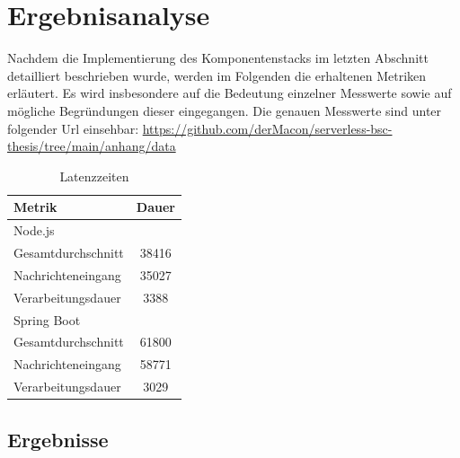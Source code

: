 \chapter{Ergebnisanalyse}
\label{ch:ergebnisanalyse}

Nachdem die Implementierung des Komponentenstacks im letzten Abschnitt detailliert beschrieben wurde, werden im Folgenden die erhaltenen Metriken erläutert. Es wird insbesondere auf die Bedeutung einzelner Messwerte sowie auf mögliche Begründungen dieser eingegangen. Die genauen Messwerte sind unter folgender Url einsehbar: \url{https://github.com/derMacon/serverless-bsc-thesis/tree/main/anhang/data}

\label{tab:latency}
\begin{table}[ht!]
  \centering
  \begin{tabular}{@{}lc@{}}
    \toprule
    Metrik & Dauer \\
    \midrule
    Node.js \\
    \hspace{3mm}Gesamtdurchschnitt & 38416 \\
    \hspace{3mm}Nachrichteneingang & 35027 \\
    \hspace{3mm}Verarbeitungsdauer & 3388 \\
    \midrule
    Spring Boot \\
    \hspace{3mm}Gesamtdurchschnitt & 61800 \\
    \hspace{3mm}Nachrichteneingang & 58771 \\
    \hspace{3mm}Verarbeitungsdauer & 3029 \\
    \bottomrule
  \end{tabular}
  \caption[Latenzzeit - Vergleich]{Latenzzeiten}
\end{table} 

\section{Ergebnisse}



